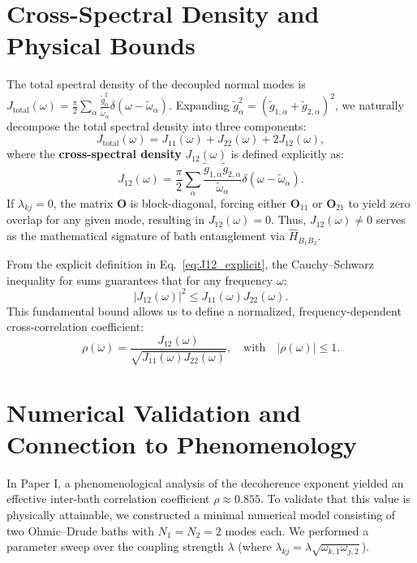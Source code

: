 \documentclass[aps,pra,reprint,amsmath,amssymb,superscriptaddress]{revtex4-2}
\begin{document}
\section{Cross-Spectral Density and Physical Bounds}
The total spectral density of the decoupled normal modes is $J_{\text{total}}(\omega) = \frac{\pi}{2} \sum_\alpha \frac{\tilde{g}_\alpha^2}{\tilde{\omega}_\alpha} \delta(\omega - \tilde{\omega}_\alpha)$. Expanding $\tilde{g}_\alpha^2 = (\tilde{g}_{1,\alpha} + \tilde{g}_{2,\alpha})^2$, we naturally decompose the total spectral density into three components:
\begin{equation}
J_{\text{total}}(\omega) = J_{11}(\omega) + J_{22}(\omega) + 2 J_{12}(\omega),
\label{eq:J_total_split}
\end{equation}
where the \textbf{cross-spectral density} $J_{12}(\omega)$ is defined explicitly as:
\begin{equation}
J_{12}(\omega) = \frac{\pi}{2} \sum_{\alpha} \frac{\tilde{g}_{1,\alpha} \tilde{g}_{2,\alpha}}{\tilde{\omega}_\alpha} \delta(\omega - \tilde{\omega}_\alpha).
\label{eq:J12_explicit}
\end{equation}
If $\lambda_{kj} = 0$, the matrix $\mathbf{O}$ is block-diagonal, forcing either $\mathbf{O}_{11}$ or $\mathbf{O}_{21}$ to yield zero overlap for any given mode, resulting in $J_{12}(\omega) = 0$. Thus, $J_{12}(\omega) \neq 0$ serves as the mathematical signature of bath entanglement via $\hat{H}_{B_1 B_2}$.

From the explicit definition in Eq.~\eqref{eq:J12_explicit}, the Cauchy--Schwarz inequality for sums guarantees that for any frequency $\omega$:
\begin{equation}
|J_{12}(\omega)|^2 \leq J_{11}(\omega) J_{22}(\omega).
\label{eq:cauchy_schwarz}
\end{equation}
This fundamental bound allows us to define a normalized, frequency-dependent cross-correlation coefficient:
\begin{equation}
\rho(\omega) = \frac{J_{12}(\omega)}{\sqrt{J_{11}(\omega) J_{22}(\omega)}}, \quad \text{with} \quad |\rho(\omega)| \leq 1.
\label{eq:rho_def}
\end{equation}

\section{Numerical Validation and Connection to Phenomenology}
In Paper I, a phenomenological analysis of the decoherence exponent yielded an effective inter-bath correlation coefficient $\rho \approx 0.855$. To validate that this value is physically attainable, we constructed a minimal numerical model consisting of two Ohmic--Drude baths with $N_1 = N_2 = 2$ modes each. We performed a parameter sweep over the coupling strength $\lambda$ (where $\lambda_{kj} = \lambda \sqrt{\omega_{k,1} \omega_{j,2}}$). 
\end{document}
